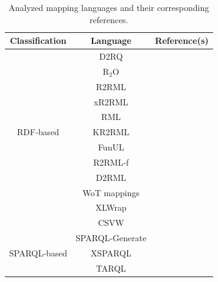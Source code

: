 \begin{table}[t]
\caption[Mapping languages overview]{Analyzed mapping languages and their corresponding references. }
\label{tab:chp2_languages_summary}
\begin{tabular}{c|c|c}
\hline
Classification                 & Language        & Reference(s) \\ \hline
\multirow{11}{*}{RDF-based}   & D2RQ            & \parencite{bizer2004d2rq,d2rq}\\ \cline{2-3} 
                              & R$_2$O          & \parencite{barrasa2004r2o}\\ \cline{2-3} 
                              & R2RML           & \parencite{das2012r2rml}\\ \cline{2-3} 
                              & xR2RML          & \parencite{michel2015xr2rml,xr2rml}\\ \cline{2-3} 
                              & RML             & \parencite{Dimou2014rml,rml}\\ \cline{2-3} 
                              & KR2RML          & \parencite{slepicka2015kr2rml}\\ \cline{2-3} 
                              & FunUL           & \parencite{junior2016funul}\\ \cline{2-3} 
                              & R2RML-f         & \parencite{debruyne2016r2rmlf}\\ \cline{2-3} 
                              & D2RML           & \parencite{chortaras2018d2rml}\\ \cline{2-3}  
                              & WoT mappings    & \parencite{cimmino2020ewot}\\ \cline{2-3} 
                              & XLWrap          & \parencite{langegger2009xlwrap,xlwrap}\\ \cline{2-3} 
                              & CSVW            & \parencite{Tennison2015csvw}\\ \hline
\multirow{4}{*}{SPARQL-based} & SPARQL-Generate &     
                              \parencite{Lefrancois2017sparqlgenerate,sparqlgenerate}\\ \cline{2-3} 
                              & XSPARQL         & \parencite{Bischof2012xsparql,xsparql}\\ \cline{2-3} 
                              & TARQL           & \parencite{tarql}\\ \cline{2-3}

\end{tabular}
\end{table}
